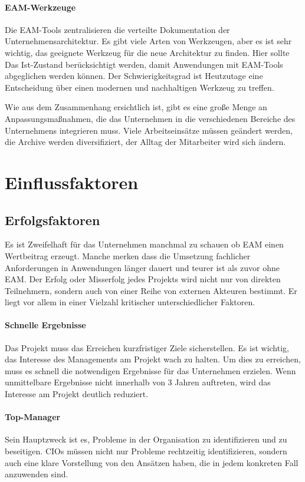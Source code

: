 \documentclass[
	doc,
	a4paper,
	helv
	]{apa6}
\begin{document}
\paragraph{EAM-Werkzeuge}
Die EAM-Tools zentralisieren die verteilte Dokumentation der Unternehmensarchitektur. Es gibt viele Arten von Werkzeugen, aber es ist sehr wichtig, das geeignete Werkzeug für die neue Architektur zu finden. Hier sollte Das Ist-Zustand berücksichtigt werden, damit Anwendungen mit EAM-Tools abgeglichen werden können. Der Schwierigkeitsgrad ist Heutzutage eine Entscheidung über einen modernen und nachhaltigen Werkzeug zu treffen.

Wie aus dem Zusammenhang ersichtlich ist, gibt es eine große Menge an Anpassungsmaßnahmen, die das Unternehmen in die verschiedenen Bereiche des Unternehmens integrieren muss. Viele Arbeitseinsätze müssen geändert werden, die Archive werden diversifiziert, der Alltag der Mitarbeiter wird sich ändern.

\section{Einflussfaktoren}
\subsection{Erfolgsfaktoren}
Es ist Zweifelhaft für das Unternehmen manchmal zu schauen ob EAM  einen Wertbeitrag erzeugt. Manche merken dass die Umsetzung fachlicher Anforderungen in Anwendungen länger dauert und teurer ist als zuvor ohne EAM.
Der Erfolg oder Misserfolg jedes Projekts wird nicht nur von direkten Teilnehmern, sondern auch von einer Reihe von externen Akteuren bestimmt. Er  liegt vor allem in einer Vielzahl kritischer unterschiedlicher Faktoren. \autocite{Bitkom2011}

\paragraph{Schnelle Ergebnisse}
Das Projekt muss das Erreichen kurzfristiger Ziele sicherstellen. Es ist wichtig, das Interesse des Managements am Projekt wach zu halten. Um dies zu erreichen, muss es schnell die notwendigen Ergebnisse für das Unternehmen erzielen. Wenn unmittelbare Ergebnisse nicht innerhalb von 3 Jahren auftreten, wird das Interesse am Projekt deutlich reduziert.
\paragraph{Top-Manager}
Sein Hauptzweck ist es, Probleme in der Organisation zu identifizieren und zu beseitigen. CIOs müssen nicht nur Probleme rechtzeitig identifizieren, sondern auch eine klare Vorstellung von den Ansätzen haben, die in jedem konkreten Fall anzuwenden sind.
\end{document}
